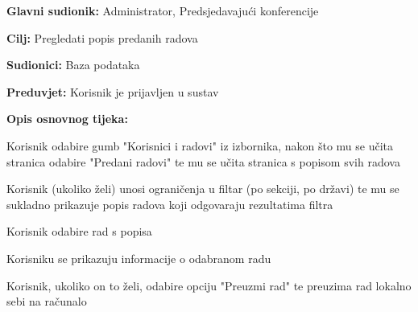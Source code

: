 					\noindent {}
					\begin{packed_item}
	
						\item \textbf{Glavni sudionik: } Administrator, Predsjedavajući konferencije
						\item  \textbf{Cilj:} Pregledati popis predanih radova
						\item  \textbf{Sudionici:} Baza podataka
						\item  \textbf{Preduvjet:} Korisnik je prijavljen u sustav
						\item  \textbf{Opis osnovnog tijeka:}
						
						\item[] \begin{packed_enum}
	
							\item Korisnik odabire gumb "Korisnici i radovi" iz izbornika, nakon što mu se učita stranica odabire "Predani radovi" te mu se učita stranica s popisom svih radova
							\item Korisnik (ukoliko želi) unosi ograničenja u filtar (po sekciji, po državi) te mu se sukladno prikazuje popis radova koji odgovaraju rezultatima filtra
							\item Korisnik odabire rad s popisa
							\item Korisniku se prikazuju informacije o odabranom radu
							\item Korisnik, ukoliko on to želi, odabire opciju "Preuzmi rad" te preuzima rad lokalno sebi na računalo

					
						\end{packed_enum}
			
					\end{packed_item}
				
					\noindent {}
					
